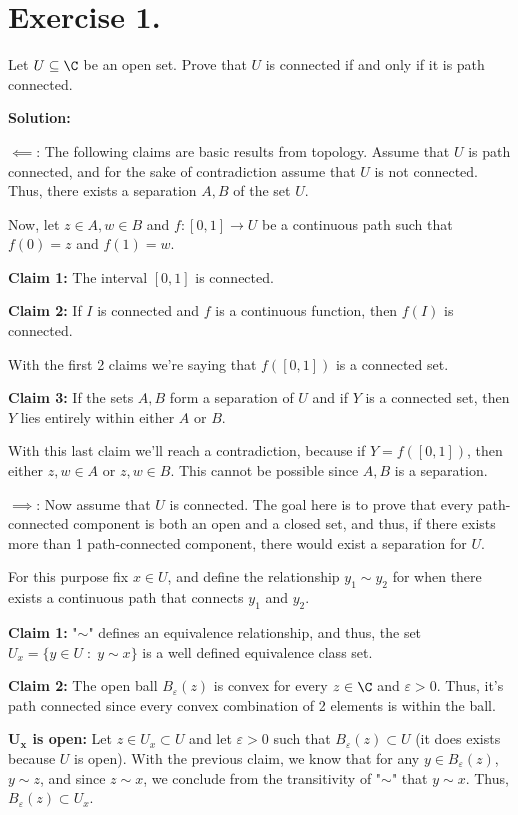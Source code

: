\section*{Exercise 1.}
Let $U\subseteq \C$ be an open set. Prove that $U$ is connected if and only if it is path connected.

\textbf{Solution:} 

$\boldsymbol{\impliedby}$: The following claims are basic results from topology. Assume that $U$ is path connected, and for the sake of contradiction assume that $U$ is not connected. Thus, there exists a separation $A,B$ of the set $U$.

Now, let $z\in A, w\in B$ and $f: [0,1] \to U$ be a continuous path such that $f(0) = z$ and $f(1) = w$. 

\textbf{Claim 1:} The interval $[0,1]$ is connected.

\textbf{Claim 2:} If $I$ is connected and $f$ is a continuous function, then $f(I)$ is connected.

With the first 2 claims we're saying that $f([0,1])$ is a connected set.

\textbf{Claim 3:} If the sets $A,B$ form a separation of $U$ and if $Y$ is a connected set, then $Y$ lies entirely within either $A$ or $B$. 

With this last claim we'll reach a contradiction, because if $Y = f([0,1])$, then either $z,w \in A$ or $z,w \in B$. This cannot be possible since $A,B$ is a separation.

\vspace*{2em}

$\boldsymbol{\implies}$: Now assume that $U$ is connected. The goal here is to prove that every path-connected component is both an open and a closed set, and thus, if there exists more than 1 path-connected component, there would exist a separation for $U$.

For this purpose fix $x \in U$, and define the relationship $y_1 \sim y_2$ for when there exists a continuous path that connects $y_1$ and $y_2$.

\textbf{Claim 1:} "$\sim$" defines an equivalence relationship, and thus, the set $U_x = \{y \in U \;:\; y\sim x\}$ is a well defined equivalence class set.

\textbf{Claim 2:} The open ball $B_\varepsilon(z)$ is convex for every $z \in \C$ and $\varepsilon > 0$. Thus, it's path connected since every convex combination of 2 elements is within the ball.

\textbf{$\boldsymbol{U_x}$ is open:} Let $z \in U_x \subset U$ and let $\varepsilon > 0$ such that $B_\varepsilon(z) \subset U$ (it does exists because $U$ is open). With the previous claim, we know that for any $y\in B_\varepsilon(z)$, $y\sim z$, and since $z\sim x$, we conclude from the transitivity of "$\sim$" that $y\sim x$. Thus, $B_\varepsilon(z) \subset U_x$.

